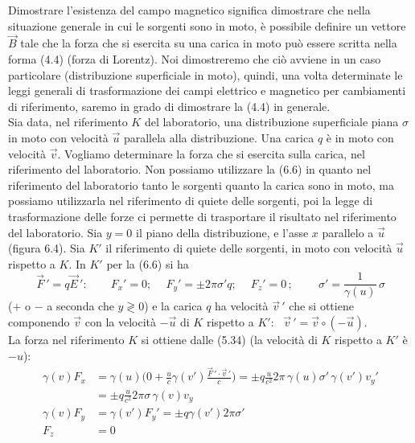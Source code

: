 Dimostrare l'esistenza del campo magnetico significa dimostrare che nella
situazione generale in cui le sorgenti sono in moto, \`e possibile definire un
vettore $\vec B$ tale che la forza che si esercita su una carica in moto pu\`o
essere scritta nella forma (4.4) (forza di Lorentz). Noi dimostreremo che ci\`o
avviene in un caso particolare (distribuzione superficiale in moto), quindi, una
volta determinate le leggi generali di trasformazione dei campi elettrico e
magnetico per cambiamenti di riferimento, saremo in grado di dimostrare la (4.4)
in generale.\\
Sia data, nel riferimento $K$ del laboratorio, una distribuzione superficiale
piana $\sigma$ in moto con velocit\`a $\vec u$ parallela alla distribuzione. Una
carica $q$ \`e in moto con velocit\`a $\vec v$. Vogliamo determinare la forza
che si esercita sulla carica, nel riferimento del laboratorio. Non possiamo
utilizzare la (6.6) in quanto nel riferimento del laboratorio tanto le sorgenti
quanto la carica sono in moto, ma possiamo utilizzarla nel riferimento di quiete
delle sorgenti, poi la legge di trasformazione delle forze ci permette di
trasportare il risultato nel riferimento del laboratorio.
Sia $y=0$ il piano della distribuzione, e l'asse $x$ parallelo a $\vec u$
(figura 6.4). Sia $K'$ il riferimento di quiete delle sorgenti, in moto con
velocit\`a $\vec u$ rispetto a $K$. In $K'$ per la (6.6) si ha
\begin{equation}
  \vec F\,'=q\vec E\,':\qquad F_x'=0;\quad\ F_y'=\pm2\pi\sigma'q;
  \quad\ F_z'=0\,;\qquad\ \sigma'=\frac{1}{\gamma(u)}\,\sigma
  \tag{6.7}
\end{equation}
($+$ o $-$ a seconda che $y\gtrless0$) e la carica $q$ ha velocit\`a $\vec v\,'$
che si ottiene componendo $\vec v$ con la velocit\`a $-\vec u$ di $K$ rispetto a
$K'$: \ $\vec v\,'=\vec v\circ(-\vec u)$.\\
La forza nel riferimento $K$ si ottiene dalle (5.34) (la velocit\`a di $K$
rispetto a $K'$ \`e $-u$):
\begin{equation}
  \begin{aligned}
    \gamma(v)F_x&=\gamma(u)
    \Big(0+\frac{u}{c}\gamma(v')\frac{\vec F\,'\cdot\vec v\,'}{c}\Big)
    =\pm q\frac{u}{c^2}2\pi\,\gamma(u)\sigma'\,\gamma(v')v_y'\\
    &=\pm q\frac{u}{c^2}2\pi\sigma\,\gamma(v)v_y\\
    \gamma(v)F_y&=\gamma(v')F_y'=\pm q\gamma(v')2\pi\sigma'\\
    F_z&=0
  \end{aligned}
  \tag{6.8}
\end{equation}
